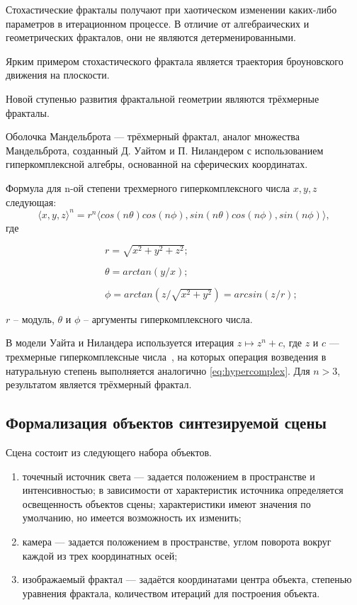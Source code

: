 
Стохастические фракталы получают при хаотическом изменении каких-либо параметров
в итерационном процессе. В отличие от алгебраических и геометрических фракталов, они не являются детерменированными.

Ярким примером стохастического фрактала является траектория броуновского движения на плоскости.


Новой ступенью развития фрактальной геометрии являются трёхмерные фракталы.

Оболочка Мандельброта --- трёхмерный фрактал, аналог множества Мандельброта, созданный
Д. Уайтом и П. Ниландером с использованием гиперкомплексной алгебры, основанной на сферических координатах.

Формула для n-ой степени трехмерного гиперкомплексного числа ${x, y, z}$ следующая:
\begin{equation}
  \langle x, y, z \rangle ^n = r^n \langle cos(n\theta)cos(n\phi), sin(n\theta)cos(n\phi), sin(n\phi) \rangle,
  \label{eq:hypercomplex}
\end{equation}
где

$\qquad\qquad\qquad\qquad\qquad r  = \sqrt{x^2 + y^2 + z^2};$

$\qquad\qquad\qquad\qquad\qquad \theta = arctan(y/x);$

$\qquad\qquad\qquad\qquad\qquad \phi = arctan(z/\sqrt{x^2 + y^2}) = arcsin(z/r);$

\qquad $r$ -- модуль, $\theta$ и $\phi$ -- аргументы гиперкомплексного числа.

В модели Уайта и Ниландера используется итерация $z \mapsto z^n + c$, где $z$ и $c$ ---
трехмерные гиперкомплексные числа~\cite{algebra_mandelbulb}, на которых операция возведения в натуральную степень
выполняется аналогично \ref{eq:hypercomplex}. Для $n > 3$, результатом
является трёхмерный фрактал.

\subsection{Формализация объектов синтезируемой сцены}

Сцена состоит из следующего набора объектов.
\begin{enumerate}
	\item точечный источник света --- задается положением в пространстве и интенсивностью; в зависимости от характеристик источника определяется освещенность объектов сцены; характеристики имеют значения по умолчанию, но имеется возможность их изменить;
	\item камера --- задается положением в пространстве, углом поворота вокруг каждой из трех координатных осей;
  \item изображаемый фрактал --- задаётся координатами центра объекта, степенью уравнения фрактала, количеством итераций для построения объекта.
\end{enumerate}

